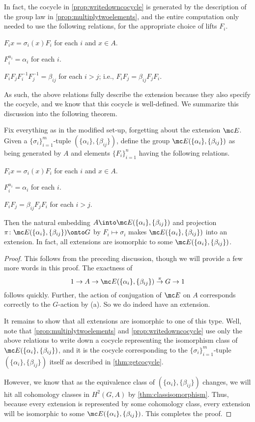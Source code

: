 \documentclass{article}
\numberwithin{equation}{section}
\begin{document}
In fact, the cocycle in \autoref{prop:writedowncocycle} is generated by the description of the group law in \autoref{prop:multiplytwoelements}, and the entire computation only needed to use the following relations, for the appropriate choice of lifts $F_i$.
\begin{listalph}
	\item $F_ix=\sigma_i(x)F_i$ for each $i$ and $x\in A$.
	\item $F_i^{n_i}=\alpha_i$ for each $i$.
	\item $F_iF_jF_i^{-1}F_j^{-1}=\beta_{ij}$ for each $i>j$; i.e., $F_iF_j=\beta_{ij}F_jF_i$.
\end{listalph}
As such, the above relations fully describe the extension because they also specify the cocycle, and we know that this cocycle is well-defined. We summarize this discussion into the following theorem.
\begin{theorem}
	Fix everything as in the modified set-up, forgetting about the extension $\mc E$. Given a $\{\sigma_i\}_{i=1}^m$-tuple $(\{\alpha_i\},\{\beta_{ij}\})$, define the group $\mc E(\{\alpha_i\},\{\beta_{ij}\})$ as being generated by $A$ and elements $\{F_i\}_{i=1}^n$ having the following relations.
	\begin{listalph}
		\item $F_ix=\sigma_i(x)F_i$ for each $i$ and $x\in A$.
		\item $F_i^{n_i}=\alpha_i$ for each $i$.
		\item $F_iF_j=\beta_{ij}F_jF_i$ for each $i>j$.
	\end{listalph}
	Then the natural embedding $A\into\mc E(\{\alpha_i\},\{\beta_{ij}\})$ and projection $\pi\colon\mc E(\{\alpha_i\},\{\beta_{ij}\})\onto G$ by $F_i\mapsto\sigma_i$ makes $\mc E(\{\alpha_i\},\{\beta_{ij}\})$ into an extension. In fact, all extensions are isomorphic to some $\mc E(\{\alpha_i\},\{\beta_{ij}\})$.
\end{theorem}
\begin{proof}
	This follows from the preceding discussion, though we will provide a few more words in this proof. The exactness of
	\[1\to A\to\mc E(\{\alpha_i\},\{\beta_{ij}\})\stackrel\pi\to G\to1\]
	follows quickly. Further, the action of conjugation of $\mc E$ on $A$ corresponds correctly to the $ G$-action by (a). So we do indeed have an extension.

	It remains to show that all extensions are isomorphic to one of this type. Well, note that \autoref{prop:multiplytwoelements} and \autoref{prop:writedowncocycle} use only the above relations to write down a cocycle representing the isomorphism class of $\mc E(\{\alpha_i\},\{\beta_{ij}\})$, and it is the cocycle corresponding to the $\{\sigma_i\}_{i=1}^m$-tuple $(\{\alpha_i\},\{\beta_{ij}\})$ itself as described in \autoref{thm:getcocycle}.

	However, we know that as the equivalence class of $(\{\alpha_i\},\{\beta_{ij}\})$ changes, we will hit all cohomology classes in $H^2( G,A)$ by \autoref{thm:classisomorphism}. Thus, because every extension is represented by some cohomology class, every extension will be isomorphic to some $\mc E(\{\alpha_i\},\{\beta_{ij}\})$. This completes the proof.
\end{proof}
\end{document}
